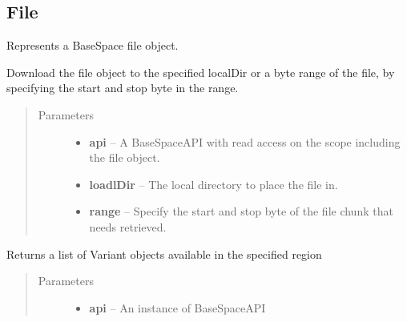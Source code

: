 \documentclass[letterpaper,10pt,english]{sphinxmanual}
\begin{document}
\subsection{File}
\label{Available modules:file}

\begin{fulllineitems}
\label{Available modules:BaseSpacePy.model.File.File}
Represents a BaseSpace file object.

\begin{fulllineitems}
\label{Available modules:BaseSpacePy.model.File.File.downloadFile}
Download the file object to the specified localDir or a byte range of the file, by specifying the 
start and stop byte in the range.
\begin{quote}\begin{description}
\item[{Parameters}] \leavevmode\begin{itemize}
\item {} 
\textbf{api} -- A BaseSpaceAPI with read access on the scope including the file object.

\item {} 
\textbf{loadlDir} -- The local directory to place the file in.

\item {} 
\textbf{range} -- Specify the start and stop byte of the file chunk that needs retrieved.

\end{itemize}

\end{description}\end{quote}

\end{fulllineitems}


\begin{fulllineitems}
\label{Available modules:BaseSpacePy.model.File.File.filterVariant}
Returns a list of Variant objects available in the specified region
\begin{quote}\begin{description}
\item[{Parameters}] \leavevmode\begin{itemize}
\item {} 
\textbf{api} -- An instance of BaseSpaceAPI


\end{itemize}
\end{description}
\end{quote}
\end{fulllineitems}
\end{fulllineitems}
\end{document}
